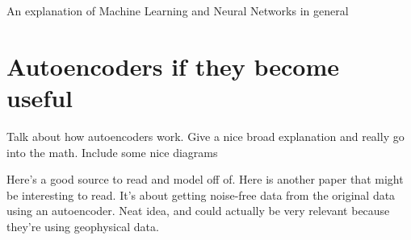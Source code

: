 An explanation of Machine Learning and Neural Networks in general

\section{Autoencoders if they become useful}
Talk about how autoencoders work. Give a nice broad explanation and really go into the math. Include some nice diagrams

Here's \cite{ng2011sparse} a good source to read and model off of. Here \cite{Bhowick2019} is another paper that might be interesting to read. It's about getting noise-free data from the original data using an autoencoder. Neat idea, and could actually be very relevant because they're using geophysical data.